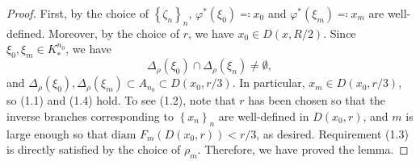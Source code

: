 \documentclass[10pt,a4paper]{amsart}
\begin{document}
\begin{proof}
First, by the choice of $ \left\lbrace \zeta_n\right\rbrace _n $, $ \varphi^*(\xi_0)\eqqcolon x_0 $ and $ \varphi^*(\xi_m)\eqqcolon x_m $ are well-defined. Moreover, by the choice of $ r $, we have $ x_0\in D(x, R/2) $. Since $ \xi_0, \xi_m \in K^{n_0}_*$, we have 
\[\Delta_{\rho}(\xi_0)\cap  \Delta_{ \rho}(\xi_n)\neq\emptyset,\]
and $ \Delta_{\rho}(\xi_0), \Delta_{\rho}(\xi_m)\subset A_{n_0}\subset D(x_0, r/3) $. In particular, $ x_m\in D(x_0, r/3) $, so (1.1) and (1.4) hold. To see (1.2), note that $ r $ has been chosen so that the inverse branches corresponding to $ \left\lbrace x_n\right\rbrace _n $ are well-defined in $ D(x_0,r) $, and $ m $ is large enough so that $ \textrm{diam }F_m(D(x_0, r))<r/3  $, as desired.
 Requirement (1.3)  is directly satisfied by the choice of $ \rho_m $. Therefore, we have proved the lemma.
\end{proof}
\end{document}
